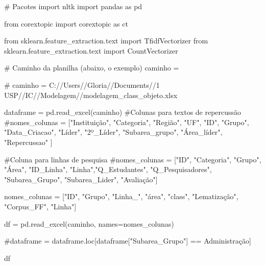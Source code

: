 \documentclass[
  brazilian,
  letterpaper,
  DIV=11,
  numbers=noendperiod]{scrartcl}
\newenvironment{Shaded}{\begin{snugshade}}{\end{snugshade}}
\newcommand{\CommentTok}[1]{\textcolor[rgb]{0.37,0.37,0.37}{#1}}
\newcommand{\ImportTok}[1]{\textcolor[rgb]{0.00,0.46,0.62}{#1}}
\newcommand{\NormalTok}[1]{\textcolor[rgb]{0.00,0.23,0.31}{#1}}
\newcommand{\OperatorTok}[1]{\textcolor[rgb]{0.37,0.37,0.37}{#1}}
\newcommand{\StringTok}[1]{\textcolor[rgb]{0.13,0.47,0.30}{#1}}
\begin{document}
\begin{Shaded}
\begin{Highlighting}[]

\CommentTok{\# Pacotes}
\ImportTok{import}\NormalTok{ nltk}
\ImportTok{import}\NormalTok{ pandas }\ImportTok{as}\NormalTok{ pd}

\ImportTok{from}\NormalTok{ corextopic }\ImportTok{import}\NormalTok{ corextopic }\ImportTok{as}\NormalTok{ ct}

\ImportTok{from}\NormalTok{ sklearn.feature\_extraction.text }\ImportTok{import}\NormalTok{ TfidfVectorizer}
\ImportTok{from}\NormalTok{ sklearn.feature\_extraction.text }\ImportTok{import}\NormalTok{ CountVectorizer}

\CommentTok{\# Caminho da planilha (abaixo, o exemplo)}
\NormalTok{caminho }\OperatorTok{=} \StringTok{\textquotesingle{}\textquotesingle{}} 

\CommentTok{\# caminho = \textquotesingle{}C://Users//Gloria//Documents//1 USP//IC//Modelagem//modelagem\_class\_objeto.xlsx\textquotesingle{}}

\NormalTok{dataframe }\OperatorTok{=}\NormalTok{ pd.read\_excel(caminho)}
\CommentTok{\#Colunas para textos de repercussão}
\CommentTok{\#nomes\_colunas = ["Instituição", "Categoria", "Região", "UF", "ID", "Grupo", "Data\_Criacao", "Líder", "2º\_Líder", "Subarea\_grupo", "Área\_líder", "Repercussao" ]}

\CommentTok{\#Coluna para linhas de pesquisa}
\CommentTok{\#nomes\_colunas = ["ID", "Categoria", "Grupo", "Área", "ID\_Linha", "Linha","Q\_Estudantes", "Q\_Pesquisadores", "Subarea\_Grupo", "Subarea\_Lider", "Avaliação"]}

\NormalTok{nomes\_colunas }\OperatorTok{=}\NormalTok{ [}\StringTok{"ID"}\NormalTok{, }\StringTok{"Grupo"}\NormalTok{, }\StringTok{"Linha\_"}\NormalTok{, }\StringTok{"área"}\NormalTok{, }\StringTok{"class"}\NormalTok{, }\StringTok{"Lematização"}\NormalTok{, }\StringTok{"Corpus\_FF"}\NormalTok{, }\StringTok{"Linha"}\NormalTok{]}

\NormalTok{df }\OperatorTok{=}\NormalTok{ pd.read\_excel(caminho, names}\OperatorTok{=}\NormalTok{nomes\_colunas)}

\CommentTok{\#dataframe = dataframe.loc[dataframe["Subarea\_Grupo"] == \textquotesingle{}Administração\textquotesingle{}]}

\NormalTok{df}


\end{Highlighting}
\end{Shaded}
\end{document}
